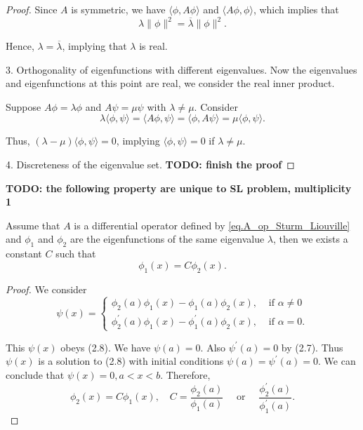 \begin{proof}
    Since $A$ is symmetric, we have $\langle \phi, A\phi \rangle$ and $\langle A\phi, \phi \rangle$, which implies that
    \begin{equation}
    \lambda \|\phi\|^2 = \overline{\lambda} \|\phi\|^2.
    \end{equation}
    
    Hence, $\lambda = \overline{\lambda}$, implying that $\lambda$ is real.
    
    3. Orthogonality of eigenfunctions with different eigenvalues. Now the eigenvalues and eigenfunctions at this point are real, we consider the real inner product.
    
    Suppose $A\phi = \lambda \phi$ and $A\psi = \mu \psi$ with $\lambda \neq \mu$. Consider
    \begin{equation}
    \lambda \langle \phi, \psi \rangle = \langle A\phi, \psi \rangle = \langle \phi, A\psi \rangle = \mu \langle \phi, \psi \rangle.
    \end{equation}
    
    Thus, $(\lambda - \mu) \langle \phi, \psi \rangle = 0$, implying $\langle \phi, \psi \rangle = 0$ if $\lambda \neq \mu$.
    
    4. Discreteness of the eigenvalue set. 
    \textbf{TODO: finish the proof}
\end{proof}

\textbf{TODO: the following property are unique to SL problem, multiplicity 1}
\begin{theorem}\label{th.SL_2} Assume that $A$ is a differential operator defined by \eqref{eq.A_op_Sturm_Liouville} and $\phi_1$ and $\phi_2$ are the eigenfunctions of the same eigenvalue $\lambda$, then we exists a constant $C$ such that 
    \begin{equation}\label{eq.SL_multiplicity_one}
        \phi_1(x) = C\phi_2(x).
    \end{equation}
\end{theorem}

\begin{proof}
We consider
$$
\psi(x)= \begin{cases}\phi_2(a) \phi_1(x)-\phi_1(a) \phi_2(x), & \text { if } \alpha \neq 0 \\ \phi_2^{\prime}(a) \phi_1(x)-\phi_1^{\prime}(a) \phi_2(x), & \text { if } \alpha=0 .\end{cases}
$$

This $\psi(x)$ obeys (2.8). We have $\psi(a)=0$. Also $\psi^{\prime}(a)=0$ by (2.7). Thus $\psi(x)$ is a solution to (2.8) with initial conditions $\psi(a)=\psi^{\prime}(a)=0$. We can conclude that $\psi(x)=0, a<x<b$. Therefore,
$$
\phi_2(x)=C \phi_1(x), \quad C=\frac{\phi_2(a)}{\phi_1(a)} \quad \text { or } \quad \frac{\phi_2^{\prime}(a)}{\phi_1^{\prime}(a)} .
$$

\end{proof}



